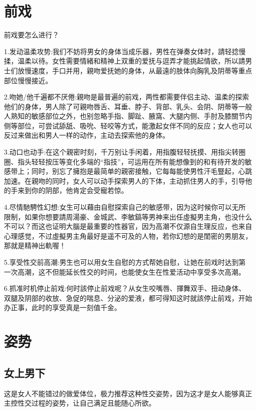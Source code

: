 \documentclass[12pt,UTF8]{ctexbook}
\begin{document}
\chapter{前戏}

前戏要怎么进行？

1.发动温柔攻势:我们不妨将男女的身体当成乐器，男性在弹奏女体时，請轻捻慢揉，温柔以待。女性需要情緒和精神上双重的爱抚与逗弄才能挑起情欲，所以請男士们放慢速度，手口并用，親吻爱抚她的身体，从最遠的肢体向胸乳及阴蒂等重点部位慢慢接近。

2.吻她/他千遍都不厌倦:親吻是最普遍的前戏，两性都需要伴侣主动、温柔的探索他们的身体，男人除了可親吻唇舌、耳垂、脖子、背部、乳头、会阴、阴蒂等一般人熟知的敏感部位之外，也别忽略手指、脚趾、腋窩、大腿内侧、手肘及膝關节内侧等部位，可尝试舔舐、吸吮、轻咬等方式，能激起女伴不同的反应；女人也可以反过来做出和男人一样的动作，主动去探索他的身体。

3.动口也动手:在这个親密时刻，千万别让手闲着，用指腹轻轻抚摸、用指尖转圈圈、指头轻轻按压等变化多端的“指技”，可运用在所有能想像到的和有待开发的敏感带上；同时，别忘了擁抱是最简单的親密接触，它每每能使男性汗毛豎起，心跳加速。在親吻的同时，女人可以动手探索男人的下体，主动抓住男人的手，引导他的手来到你的阴部，他肯定会受寵若惊。

4.尽情馳騁性幻想:女生可以藉由自慰探索自己的敏感带，因为这时候你可以无所限制，如果你想要請周湯豪、金城武、李敏鎬等男神来出任虛擬男主角，也没什么不可以？而这也证明大腦是最重要的性器官，因为高潮不仅源自生理反应，也来自心理感觉，不过虛擬男主角最好是遥不可及的人物，若你幻想的是閨密的男朋友，那就是精神出軌喔！

5.享受性交前高潮:男生也可以用女生自慰的方式帮她自慰，让她在前戏时达到第一次高潮，这不但能延长性交的时间，也能使女生在性爱活动中享受多次高潮。

6.抓准时机停止前戏:何时該停止前戏呢？从女生咬嘴唇、揮舞双手、扭动身体、双腿及阴部的收放、急促的喘息、分泌的爱液，都可得知这时就該停止前戏，开始办正事，此时的享受真是一刻值千金。

\chapter{姿势}

\section{女上男下}

这是女人不能错过的做爱体位，极力推荐这种性交姿势，因为这才是女人能够真正主控性交过程的姿势，让自己满足且能随心所欲。
\end{document}

